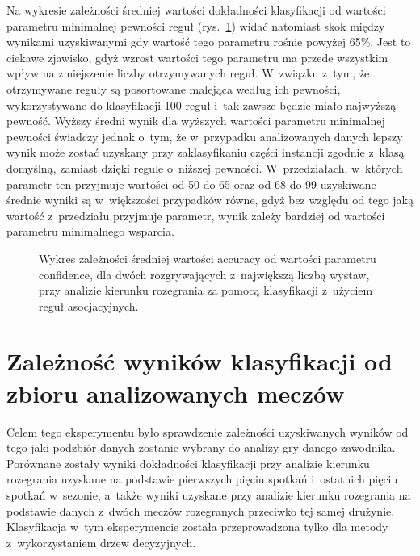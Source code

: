 \documentclass[a4paper,twoside,12pt]{book}
\begin{document}
Na wykresie zależności średniej wartości dokładności klasyfikacji od wartości parametru minimalnej pewności reguł (rys.~\ref{fig:confidence-r-kierunek-rules}) widać natomiast skok między wynikami uzyskiwanymi gdy wartość tego parametru rośnie powyżej 65\%. Jest to ciekawe zjawisko, gdyż wzrost wartości tego parametru ma przede wszystkim wpływ na zmiejszenie liczby otrzymywanych reguł. W~związku z~tym, że otrzymywane reguły są posortowane malejąca według ich pewności, wykorzystywane do klasyfikacji 100 reguł i~tak zawsze będzie miało najwyższą pewność. Wyższy średni wynik dla wyższych wartości parametru minimalnej pewności świadczy jednak o~tym, że w~przypadku analizowanych danych lepszy wynik może zostać uzyskany przy zaklasyfikaniu części instancji zgodnie z~klasą domyślną, zamiast dzięki regule o~niższej pewności. W~przedziałach, w~których parametr ten przyjmuje wartości od 50 do 65 oraz od 68 do 99 uzyskiwane średnie wyniki są w~większości przypadków równe, gdyż bez względu od tego jaką wartość z~przedziału przyjmuje parametr, wynik zależy bardziej od wartości parametru minimalnego wsparcia.

\begin{figure}
\centering
{}
\caption{Wykres zależności średniej wartości accuracy od wartości parametru confidence, dla dwóch rozgrywających z~największą liczbą wystaw, przy analizie kierunku rozegrania za pomocą klasyfikacji z~użyciem reguł asocjacyjnych.}
\label{fig:confidence-r-kierunek-rules}
\end{figure}

\section{Zależność wyników klasyfikacji od zbioru analizowanych meczów}

Celem tego eksperymentu było sprawdzenie zależności uzyskiwanych wyników od tego jaki podzbiór danych zostanie wybrany do analizy gry danego zawodnika. Porównane zostały wyniki dokładności klasyfikacji przy analizie kierunku rozegrania uzyskane na podstawie pierwszych pięciu spotkań i~ostatnich pięciu spotkań w~sezonie, a~także wyniki uzyskane przy analizie kierunku rozegrania na podstawie danych z~dwóch meczów rozegranych przeciwko tej samej drużynie. Klasyfikacja w~tym eksperymencie została przeprowadzona tylko dla metody z~wykorzystaniem drzew decyzyjnych.
\end{document}
